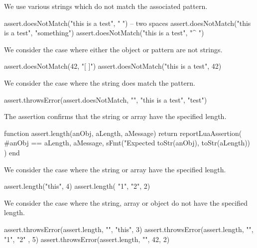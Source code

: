We use various strings which do not match the associated pattern. 

\startLuaTest
  assert.doesNotMatch("this is a test", "  ") -- two spaces
  assert.doesNotMatch("this is a test", "something")
  assert.doesNotMatch("this is a test", "^ ")
\stopLuaTest
\stopTestCase


We consider the case where either the object or pattern are not strings. 

\startLuaTest
  assert.doesNotMatch(42, "[ ]")
  assert.doesNotMatch("this is a test", 42)
\stopLuaTest
\stopTestCase


We consider the case where the string does match the pattern.

\startLuaTest
  assert.throwsError(assert.doesNotMatch, "", "this is a test", "test")
\stopLuaTest
\stopTestCase

\stopTestSuite


The  assertion confirms that the string or array have 
the specified length. 

\startLuaCode
function assert.length(anObj, aLength, aMessage)
  return reportLuaAssertion(
    #anObj == aLength,
    aMessage,
    sFmt("Expected %
      toStr(anObj), toStr(aLength))
  )
end
\stopLuaCode


We consider the case where the string or array have the specified length. 

\startLuaTest
  assert.length("this", 4)
  assert.length({ "1", "2"}, 2)
\stopLuaTest
\stopTestCase


We consider the case where the string, array or object do not have the 
specified length. 

\startLuaTest
  assert.throwsError(assert.length, "", "this", 3)
  assert.throwsError(assert.length, "", { "1", "2" }, 5)
  assert.throwsError(assert.length, "", 42, 2)
\stopLuaTest
\stopTestCase

\stopTestSuite


